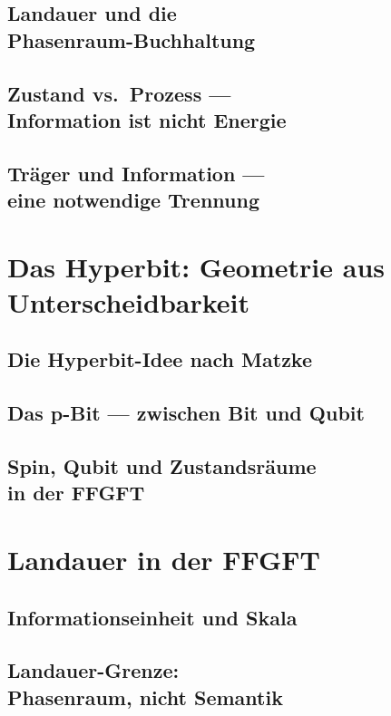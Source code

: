 \documentclass[11pt,oneside]{book}
\theoremstyle{plain}
\begin{document}
\chapter[Landauer und die Phasenraum-Buchhaltung]{Landauer und die\\ Phasenraum-Buchhaltung}

\chapter[Zustand vs.\ Prozess]{Zustand vs.\ Prozess ---\\ Information ist nicht Energie}

\chapter[Träger und Information]{Träger und Information ---\\ eine notwendige Trennung}


\part{Das Hyperbit: Geometrie aus Unterscheidbarkeit}
\chapter{Die Hyperbit-Idee nach Matzke}

\chapter{Das p-Bit --- zwischen Bit und Qubit}

\chapter[Spin, Qubit und Zustandsräume]{Spin, Qubit und Zustandsräume\\ in der FFGFT}


\part{Landauer in der FFGFT}
\chapter{Informationseinheit und Skala}
\label{ch:informationseinheit_skala}

\chapter[Landauer-Grenze: Phasenraum, nicht Semantik]{Landauer-Grenze:\\ Phasenraum, nicht Semantik}

\end{document}
